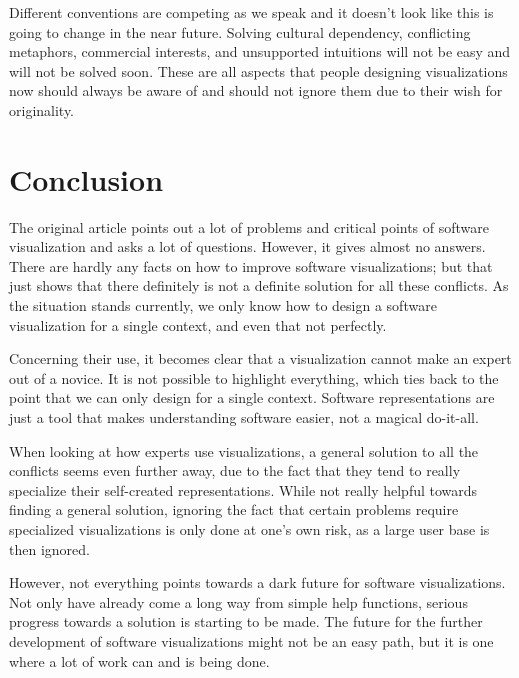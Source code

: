 \documentclass[11pt, a4paper, ngerman, twoside]{article}
\theoremstyle{plain}\newtheorem{Lemma}{Lemma}
\theoremstyle{plain}\newtheorem{Satz}[Lemma]{Satz}
\theoremstyle{definition}\newtheorem{Definition}[Lemma]{Definition}
\theoremstyle{definition}\newtheorem*{Beispiel}{Beispiel}
\theoremstyle{remark}\newtheorem*{Bemerkung}{Bemerkung}
\begin{document}
Different conventions are competing as we speak and it doesn't look like this is going to change in the near future. Solving cultural dependency, conflicting metaphors, commercial interests, and unsupported intuitions will not be easy and will not be solved soon. These are all aspects that people designing visualizations now should always be aware of and should not ignore them due to their wish for originality.

\section{Conclusion}

The original article points out a lot of problems and critical points of software visualization and asks a lot of questions. However, it gives almost no answers. There are hardly any facts on how to improve software visualizations; but that just shows that there definitely is not a definite solution for all these conflicts. As the situation stands currently, we only know how to design a software visualization for a single context, and even that not perfectly.

Concerning their use, it becomes clear that a visualization cannot make an expert out of a novice. It is not possible to highlight everything, which ties back to the point that we can only design for a single context. Software representations are just a tool that makes understanding software easier, not a magical do-it-all.

When looking at how experts use visualizations, a general solution to all the conflicts seems even further away, due to the fact that they tend to really specialize their self-created representations. While not really helpful towards finding a general solution, ignoring the fact that certain problems require specialized visualizations is only done at one's own risk, as a large user base is then ignored.

However, not everything points towards a dark future for software visualizations. Not only have already come a long way from simple help functions, serious progress towards a solution is starting to be made. The future for the further development of software visualizations might not be an easy path, but it is one where a lot of work can and is being done.



\end{document}

